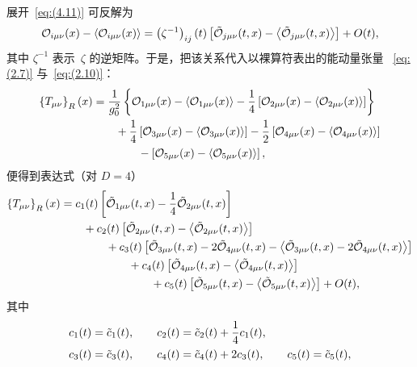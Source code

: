 展开~\eqref{eq:(4.11)} 可反解为
\begin{equation}
   \mathcal{O}_{i\mu\nu}(x)-\left\langle\mathcal{O}_{i\mu\nu}(x)\right\rangle
   =\left(\zeta^{-1}\right)_{ij}(t)
   \left[\Tilde{\mathcal{O}}_{j\mu\nu}(t,x)
   -\left\langle\Tilde{\mathcal{O}}_{j\mu\nu}(t,x)\right\rangle\right]
   +O(t),
\label{eq:(4.12)}
\end{equation}
其中 $\zeta^{-1}$ 表示~$\zeta$ 的逆矩阵。于是，把该关系代入以裸算符表出的能动量张量%
~\eqref{eq:(2.7)} 与~\eqref{eq:(2.10)}：
\begin{align}
   \left\{T_{\mu\nu}\right\}_R(x)
   &=\frac{1}{g_0^2}\left\{
   \mathcal{O}_{1\mu\nu}(x)
   -\left\langle\mathcal{O}_{1\mu\nu}(x)\right\rangle
   -\frac{1}{4}
   \left[\mathcal{O}_{2\mu\nu}(x)
   -\left\langle\mathcal{O}_{2\mu\nu}(x)\right\rangle\right]
   \right\}
\notag\\
   &\qquad{}
   +\frac{1}{4}
   \left[\mathcal{O}_{3\mu\nu}(x)
   -\left\langle\mathcal{O}_{3\mu\nu}(x)\right\rangle\right]
   -\frac{1}{2}
   \left[\mathcal{O}_{4\mu\nu}(x)
   -\left\langle\mathcal{O}_{4\mu\nu}(x)\right\rangle\right]
\notag\\
   &\qquad\qquad{}
   -\left[\mathcal{O}_{5\mu\nu}(x)
   -\left\langle\mathcal{O}_{5\mu\nu}(x)\right\rangle\right],
\label{eq:(4.13)}
\end{align}
便得到表达式（对 $D=4$）
\begin{align}
   \left\{T_{\mu\nu}\right\}_R(x)
   &=c_1(t)\left[
   \Tilde{\mathcal{O}}_{1\mu\nu}(t,x)
   -\frac{1}{4}\Tilde{\mathcal{O}}_{2\mu\nu}(t,x)
   \right]
\notag\\
   &\qquad{}
   +c_2(t)\left[
   \Tilde{\mathcal{O}}_{2\mu\nu}(t,x)
   -\left\langle\Tilde{\mathcal{O}}_{2\mu\nu}(t,x)\right\rangle
   \right]
\notag\\
   &\qquad\qquad{}
   +c_3(t)\left[
   \Tilde{\mathcal{O}}_{3\mu\nu}(t,x)
   -2\Tilde{\mathcal{O}}_{4\mu\nu}(t,x)
   -\left\langle
   \Tilde{\mathcal{O}}_{3\mu\nu}(t,x)
   -2\Tilde{\mathcal{O}}_{4\mu\nu}(t,x)
   \right\rangle
   \right]
\notag\\
   &\qquad\qquad\qquad{}
   +c_4(t)\left[
   \Tilde{\mathcal{O}}_{4\mu\nu}(t,x)
   -\left\langle\Tilde{\mathcal{O}}_{4\mu\nu}(t,x)\right\rangle
   \right]
\notag\\
   &\qquad\qquad\qquad\qquad{}
   +c_5(t)\left[
   \Tilde{\mathcal{O}}_{5\mu\nu}(t,x)
   -\left\langle\Tilde{\mathcal{O}}_{5\mu\nu}(t,x)\right\rangle
   \right]+O(t),
\label{eq:(4.14)}
\end{align}
其中
\begin{align}
   &c_1(t)=\Tilde{c}_1(t),\qquad
   c_2(t)=\Tilde{c}_2(t)+\frac{1}{4}c_1(t),
\notag\\
   &c_3(t)=\Tilde{c}_3(t),\qquad
   c_4(t)=\Tilde{c}_4(t)+2c_3(t),\qquad
   c_5(t)=\Tilde{c}_5(t),
\label{eq:(4.15)}
\end{align}
